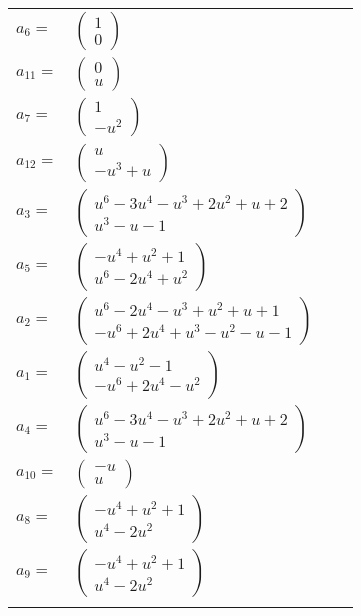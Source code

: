 \documentclass[1p]{elsarticle_modified}
\theoremstyle{definition}
\begin{document}
\begin{tabular}{m{7pt} m{180pt} m{7pt} m{180pt} }
\flushright $a_{6}=$&$\begin{pmatrix}1\\0\end{pmatrix}$ \\
\flushright $a_{11}=$&$\begin{pmatrix}0\\u\end{pmatrix}$ \\
\flushright $a_{7}=$&$\begin{pmatrix}1\\- u^2\end{pmatrix}$ \\
\flushright $a_{12}=$&$\begin{pmatrix}u\\- u^3+u\end{pmatrix}$ \\
\flushright $a_{3}=$&$\begin{pmatrix}u^6-3 u^4- u^3+2 u^2+u+2\\u^3- u-1\end{pmatrix}$ \\
\flushright $a_{5}=$&$\begin{pmatrix}- u^4+u^2+1\\u^6-2 u^4+u^2\end{pmatrix}$ \\
\flushright $a_{2}=$&$\begin{pmatrix}u^6-2 u^4- u^3+u^2+u+1\\- u^6+2 u^4+u^3- u^2- u-1\end{pmatrix}$ \\
\flushright $a_{1}=$&$\begin{pmatrix}u^4- u^2-1\\- u^6+2 u^4- u^2\end{pmatrix}$ \\
\flushright $a_{4}=$&$\begin{pmatrix}u^6-3 u^4- u^3+2 u^2+u+2\\u^3- u-1\end{pmatrix}$ \\
\flushright $a_{10}=$&$\begin{pmatrix}- u\\u\end{pmatrix}$ \\
\flushright $a_{8}=$&$\begin{pmatrix}- u^4+u^2+1\\u^4-2 u^2\end{pmatrix}$ \\
\flushright $a_{9}=$&$\begin{pmatrix}- u^4+u^2+1\\u^4-2 u^2\end{pmatrix}$\\&\end{tabular}
\end{document}
